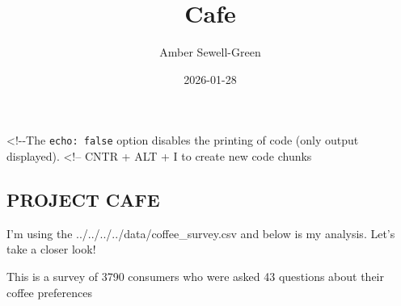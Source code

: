 \documentclass[
  letterpaper,
  DIV=11,
  numbers=noendperiod]{scrartcl}
\title{Cafe}
\author{Amber Sewell-Green}
\date{2026-01-28}
\begin{document}
\maketitle


\textless!-\/-The \texttt{echo:\ false} option disables the printing of
code (only output displayed). \textless!-- CNTR + ALT + I to create new
code chunks

\subsection{PROJECT CAFE}\label{project-cafe}

I'm using the ../../../../data/coffee\_survey.csv and below is my
analysis. Let's take a closer look!

This is a survey of 3790 consumers who were asked 43 questions about
their coffee preferences
\end{document}
